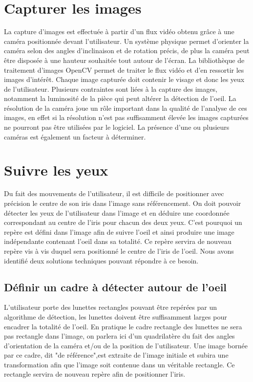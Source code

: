 \documentclass[a4paper, 12pt]{report}
\begin{document}
    \section{Capturer les images}
		La capture d'images est effectuée à partir d'un flux vidéo obtenu grâce à une caméra positionnée devant l'utilisateur. Un système physique permet d'orienter la caméra selon des angles d'inclinaison et de rotation précis, de plus la caméra peut être disposée à une hauteur souhaitée tout autour de l'écran. La bibliothèque de traitement d’images OpenCV\cite{c1} permet de traiter le flux vidéo et d'en ressortir les images d'intérêt. Chaque image capturée doit contenir le visage et donc les yeux de l'utilisateur. Plusieurs contraintes sont liées à la capture des images, notamment la luminosité de la pièce qui peut altérer la détection de l'oeil. La résolution de la caméra joue un rôle important dans la qualité de l'analyse de ces images, en effet si la résolution n'est pas suffisamment élevée les images capturées ne pourront pas être utilisées par le logiciel. La présence d'une ou plusieurs caméras est également un facteur à déterminer.  
\newpage 
	\section{Suivre les yeux}
        Du fait des mouvements de l'utilisateur, il est difficile de positionner avec précision le centre de son iris dans l'image sans référencement. On doit pouvoir détecter les yeux de l'utilisateur dans l'image et en déduire une coordonnée correspondant au centre de l'iris pour chacun des deux yeux. C'est pourquoi un repère est défini dans l'image afin de suivre l'oeil et ainsi produire une image indépendante contenant l'oeil dans sa totalité. Ce repère servira de nouveau repère vis à vis duquel sera positionné le centre de l'iris de l'oeil. Nous avons identifié deux solutions techniques pouvant répondre à ce besoin.
        \subsection{Définir un cadre à détecter autour de l'oeil}
L'utilisateur porte des lunettes rectangles pouvant être repérées par un algorithme de détection, les lunettes doivent être suffisamment larges pour encadrer la totalité de l'oeil. En pratique le cadre rectangle des lunettes ne sera pas rectangle dans l'image, on parlera ici d'un quadrilatère du fait des angles d'orientation de la caméra et/ou de la position de l'utilisateur. Une image bornée par ce cadre, dit "de référence",est extraite de l'image initiale et subira une transformation afin que l'image soit contenue dans un véritable rectangle. Ce rectangle servira de nouveau repère afin de positionner l'iris.
\end{document}
